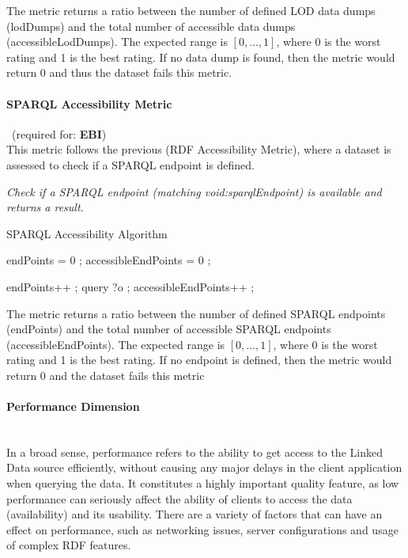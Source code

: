 The metric returns a ratio between the number of defined LOD data dumps (lodDumps) and the total number of accessible data dumps (accessibleLodDumps). 
The expected range is $[0,\ldots,1]$, where 0 is the worst rating and 1 is the best rating. If no data dump is found, then the metric would return 0 and thus the dataset fails this metric.

\paragraph{SPARQL Accessibility Metric}~(required for: \textbf{EBI})~\\
This metric follows the previous (RDF Accessibility Metric), where a dataset is assessed to check if a SPARQL endpoint is defined.

\begin{mdframed}[style=metricdefinition]
\emph{Check if a SPARQL endpoint (matching void:sparqlEndpoint) is available and returns a result.}
\end{mdframed}

\begin{algorithm}
\caption{SPARQL Accessibility Algorithm}\label{lst:deref}
\begin{algorithmic}[1]
\State endPoints = 0 ;
\State accessibleEndPoints = 0 ;
\EndProcedure

\State endPoints++ ; 
\State query ?o ;
 accessibleEndPoints++ ; \EndIf
\EndIf
\EndProcedure
\end{algorithmic}
\end{algorithm}

The metric returns a ratio between the number of defined SPARQL endpoints (endPoints) and the total number of accessible SPARQL endpoints (accessibleEndPoints). 
The expected range is $[0,\ldots,1]$, where 0 is the worst rating and 1 is the best rating. If no endpoint is defined, then the metric would return 0 and the dataset fails this metric

\paragraph{Performance Dimension}~\\ %
In a broad sense, performance refers to the ability to get access to the Linked Data source efficiently, without causing any major delays in the client application when querying the data. It constitutes a highly important quality feature, as low performance can seriously affect the ability of clients to access the data (availability) and its usability. There are a variety of factors that can have an effect on performance, such as networking issues, server configurations and usage of complex RDF features.

